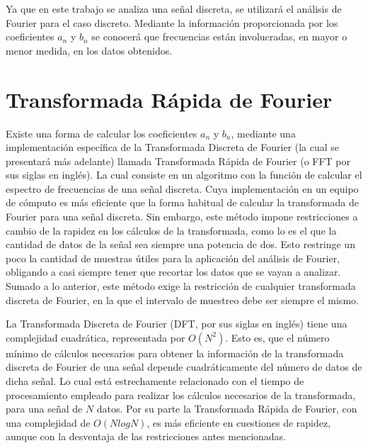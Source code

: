 Ya que en este trabajo se analiza una señal discreta, se utilizará el análisis de Fourier para el caso discreto. 
Mediante la información proporcionada por los coeficientes $a_{n}$ y $b_{n}$ se conocerá que frecuencias están involucradas, en mayor o menor medida, en los datos obtenidos.

\section{Transformada Rápida de Fourier}
Existe una forma de calcular los coeficientes $a_{n}$ y $b_{n}$, mediante una implementación específica de la Transformada Discreta de Fourier (la cual se presentará más adelante) llamada Transformada Rápida de Fourier (o FFT por sus siglas en inglés). 
La cual consiste en un algoritmo con la función de calcular el espectro de frecuencias de una señal discreta. Cuya implementación en un equipo de cómputo es más eficiente que la forma habitual de calcular la transformada de Fourier para una señal discreta.
Sin embargo, este método impone restricciones a cambio de la rapidez en los cálculos de la transformada, como lo es el que la cantidad de datos de la señal sea siempre una potencia de dos. 
Esto restringe un poco la cantidad de muestras útiles para la aplicación del análisis de Fourier, obligando a casi siempre tener que recortar los datos que se vayan a analizar. 
Sumado a lo anterior, este método exige la restricción de cualquier transformada discreta de Fourier, en la que el intervalo de muestreo debe ser siempre el mismo.

La Transformada Discreta de Fourier (DFT, por sus siglas en inglés) tiene una complejidad cuadrática, representada por $O(N^{2})$. 
Esto es, que el número mínimo de cálculos necesarios para obtener la información de la transformada discreta de Fourier de una señal depende cuadráticamente del número de datos de dicha señal. 
Lo cual está estrechamente relacionado con el tiempo de procesamiento empleado para realizar los cálculos necesarios de la transformada, para una señal de $N$ datos. 
Por su parte la Transformada Rápida de Fourier, con una complejidad de $O(NlogN)$, es más eficiente en cuestiones de rapidez, aunque con la desventaja de las restricciones antes mencionadas.

